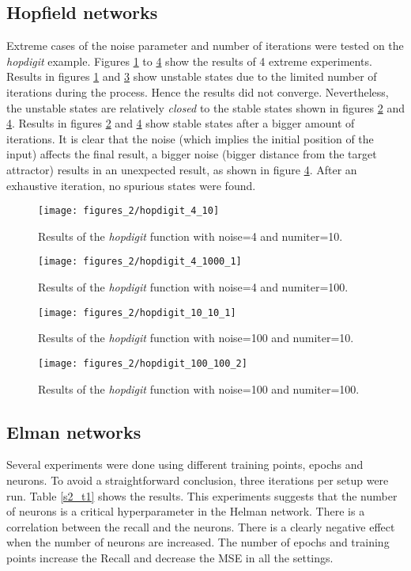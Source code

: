 \subsection{Hopfield networks}
Extreme cases of the noise parameter and number of iterations were tested on the \textit{hopdigit} example. Figures \ref{sec2_2} to \ref{sec2_3} show the results of 4 extreme experiments.
\bigbreak
Results in figures \ref{sec2_2} and \ref{sec2_4} show unstable states due to the limited number of iterations during the process. Hence the results did not converge. Nevertheless, the unstable states are relatively \textit{closed} to the stable states shown in figures \ref{sec2_1} and \ref{sec2_3}.
\bigbreak
Results in figures \ref{sec2_1} and \ref{sec2_3} show stable states after a bigger amount of iterations. It is clear that the noise (which implies the initial position of the input) affects the final result, a bigger noise (bigger distance from the target attractor) results in an unexpected result, as shown in figure \ref{sec2_3}.
\bigbreak
After an exhaustive iteration, no spurious states were found. 
\begin{figure}[!htbp]
\caption{Results of the \textit{hopdigit} function with noise=4 and numiter=10.}
\label{sec2_2}
\texttt{[image: figures\_2/hopdigit\_4\_10]}
\centering
\end{figure}

\begin{figure}[!htbp]
\caption{Results of the \textit{hopdigit} function with noise=4 and numiter=100.}
\label{sec2_1}
\medbreak
\texttt{[image: figures\_2/hopdigit\_4\_1000\_1]}
\centering
\end{figure}

\begin{figure}[!htbp]
\caption{Results of the \textit{hopdigit} function with noise=100 and numiter=10.}
\label{sec2_4}
\medbreak
\texttt{[image: figures\_2/hopdigit\_10\_10\_1]}
\centering
\end{figure}

\begin{figure}[!htbp]
\caption{Results of the \textit{hopdigit} function with noise=100 and numiter=100.}
\label{sec2_3}
\medbreak
\texttt{[image: figures\_2/hopdigit\_100\_100\_2]}
\centering
\end{figure}

\newpage

\subsection{Elman networks}
Several experiments were done using different training points, epochs and neurons. To avoid a straightforward conclusion, three iterations per setup were run. Table \ref{s2_t1} shows the results.
\bigbreak
This experiments suggests that the number of neurons is a critical hyperparameter in the Helman network. There is a correlation between the recall and the neurons. There is a clearly negative effect when the number of neurons are increased. The number of epochs and training points increase the Recall and decrease the MSE in all the settings.


